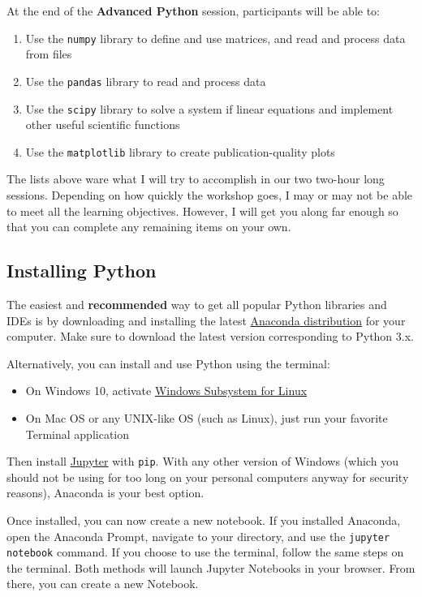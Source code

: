\documentclass[12pt]{article}
\newcommand{\code}{\texttt}
\begin{document}
At the end of the \textbf{Advanced Python} session, participants will be able to:

\begin{enumerate}
	\item Use the \code{numpy} library to define and use matrices, and read and process data from files
	\item Use the \code{pandas} library to read and process data
	\item Use the \code{scipy} library to solve a system if linear equations and implement other useful scientific functions
	\item Use the \code{matplotlib} library to create publication-quality plots
\end{enumerate}

The lists above ware what I will try to accomplish in our two two-hour long sessions. Depending on how quickly the workshop goes, I may or may not be able to meet all the learning objectives. However, I will get you along far enough so that you can complete any remaining items on your own.

\subsection{Installing Python}
The easiest and \textbf{recommended} way to get all popular Python libraries and IDEs is by downloading and installing the latest \href{https://www.anaconda.com/distribution/}{Anaconda distribution} for your computer. Make sure to download the latest version corresponding to Python 3.x.

Alternatively, you can install and use Python using the terminal: 

\begin{itemize}
	\item On Windows 10, activate \href{https://docs.microsoft.com/en-us/windows/wsl/install-win10}{Windows Subsystem for Linux}
	\item On Mac OS or any UNIX-like OS (such as Linux), just run your favorite Terminal application
\end{itemize}

Then install \href{https://jupyter.org/install}{Jupyter} with \code{pip}. With any other version of Windows (which you should not be using for too long on your personal computers anyway for security reasons), Anaconda is your best option.

Once installed, you can now create a new notebook. If you installed Anaconda, open the Anaconda Prompt, navigate to your directory, and use the \code{jupyter notebook} command. If you choose to use the terminal, follow the same steps on the terminal. Both methods will launch Jupyter Notebooks in your browser. From there, you can create a new Notebook.
\end{document}
